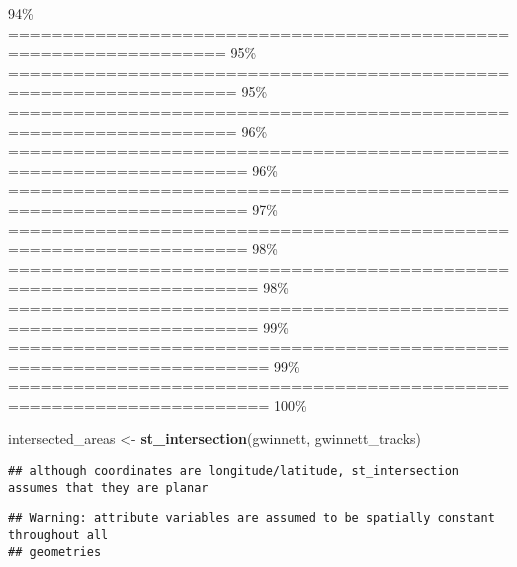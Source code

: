 \documentclass[
]{article}
\newenvironment{Shaded}{\begin{snugshade}}{\end{snugshade}}
\newcommand{\CommentTok}[1]{\textcolor[rgb]{0.56,0.35,0.01}{\textit{#1}}}
\newcommand{\DataTypeTok}[1]{\textcolor[rgb]{0.13,0.29,0.53}{#1}}
\newcommand{\KeywordTok}[1]{\textcolor[rgb]{0.13,0.29,0.53}{\textbf{#1}}}
\newcommand{\NormalTok}[1]{#1}
\newcommand{\OperatorTok}[1]{\textcolor[rgb]{0.81,0.36,0.00}{\textbf{#1}}}
\newcommand{\StringTok}[1]{\textcolor[rgb]{0.31,0.60,0.02}{#1}}
\begin{document}
\textbar{} 94\% \textbar{}
\textbar==================================================================
\textbar{} 95\% \textbar{}
\textbar===================================================================
\textbar{} 95\% \textbar{}
\textbar===================================================================
\textbar{} 96\% \textbar{}
\textbar====================================================================
\textbar{} 96\% \textbar{}
\textbar====================================================================
\textbar{} 97\% \textbar{}
\textbar====================================================================
\textbar{} 98\% \textbar{}
\textbar=====================================================================
\textbar{} 98\% \textbar{}
\textbar=====================================================================
\textbar{} 99\% \textbar{}
\textbar======================================================================\textbar{}
99\% \textbar{}
\textbar======================================================================\textbar{}
100\%

\begin{Shaded}
\begin{Highlighting}[]
\NormalTok{intersected_areas <-}\StringTok{ }\KeywordTok{st_intersection}\NormalTok{(gwinnett, gwinnett_tracks)}
\end{Highlighting}
\end{Shaded}

\begin{verbatim}
## although coordinates are longitude/latitude, st_intersection assumes that they are planar
\end{verbatim}

\begin{verbatim}
## Warning: attribute variables are assumed to be spatially constant throughout all
## geometries
\end{verbatim}

\begin{Shaded}
\end{Shaded}
\end{document}
